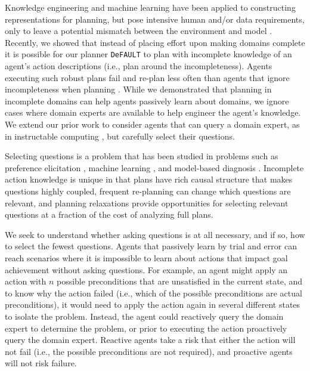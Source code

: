 \documentclass[letterpaper]{article}
\def\citep#1{\cite{#1}}
\def\default{{\tt DeFAULT}}
\begin{document}
Knowledge engineering \citep{ickeps09} and machine learning
\citep{arms,DBLP:conf/aaai/OatesC96} have been applied to constructing
representations for planning, but pose intensive human and/or data requirements,
only to leave a potential mismatch between the environment and model
\citep{modellite}.  Recently, we \cite{bryce-icaps11} showed that instead of
placing effort upon making domains complete it is possible for our planner
\default{} to plan with incomplete knowledge of an agent's action descriptions
(i.e., plan around the incompleteness).  Agents executing such robust plans fail and re-plan less often
 than agents that ignore
incompleteness when planning \citep{DBLP:conf/aips/ChangA06}.  While
we demonstrated that planning in incomplete domains can
help agents passively learn about domains, we ignore cases where domain
experts are available to help engineer the agent's knowledge.  We extend our
prior work \citep{bryce-icaps11} to consider agents that can query a domain
expert, as in instructable computing \citep{mable}, but carefully
select their questions.

Selecting questions is a problem that has been studied in problems such as
preference elicitation \citep{DBLP:conf/aaai/Boutilier02}, machine learning
\citep{AICPub1812:2011}, and model-based diagnosis
\citep{deKleer:1992:CDS:140524.140531}.  
Incomplete action knowledge is unique in that plans have rich causal structure
that makes questions highly coupled, frequent re-planning can change which
questions are relevant, and planning relaxations provide opportunities for
selecting relevant questions at a fraction of the cost of analyzing full plans.  


We seek to understand whether asking questions is at all necessary, and if so,
how to select the fewest questions.  Agents that passively learn by trial and
error can reach scenarios where it is impossible to learn about actions that impact goal
achievement without asking questions. For example, an agent might apply an
action with $n$ possible preconditions that are unsatisfied in the current
state, and to know why the action failed (i.e., which of the possible
preconditions are actual preconditions), it would need to apply the action again in 
several different states to isolate the problem.  Instead, the agent could
reactively query the domain expert to determine the problem, or prior to
executing the action proactively query the domain expert.  Reactive agents take
a risk that either the action will not fail (i.e., the possible preconditions
are not required), and proactive agents will not risk failure.  
\end{document}
